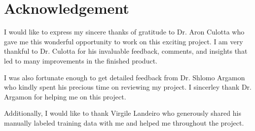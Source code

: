 \documentclass{article}
\begin{document}
\section{Acknowledgement}

I would like to express my sincere thanks of gratitude to Dr. Aron Culotta who gave me this wonderful opportunity to work on this exciting project. I am very thankful to Dr. Culotta for his invaluable feedback, comments, and insights that led to many improvements in the finished product. 

I was also fortunate enough to get detailed feedback from Dr. Shlomo Argamon who kindly spent his precious time on reviewing my project. I sincerley thank Dr. Argamon for helping me on this project. 

Additionally, I would like to thank Virgile Landeiro who generously shared his manually labeled training data with me and helped me throughout the project. 



\end{document}

